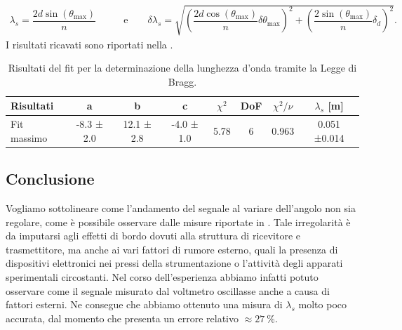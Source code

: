\documentclass[a4paper]{article}
\begin{document}
\begin{align}
  \lambda_s = \dfrac{2d \sin(\theta_{\text{max}})}{n} \qquad & \text{e}\qquad
  \delta \lambda_s = \sqrt{\left( \dfrac{2d \cos(\theta_{\text{max}})}{n}\delta \theta_{\text{max}}\right)^2 + \left(\dfrac{2\sin(\theta_{\text{max}})}{n}\delta_d\right)^2}. \label{eq:lunghezza_bragg}
\end{align}
I risultati ricavati sono riportati nella .
\begin{table}[htbp]
\centering
\begin{tabular}{|l|ccccccc|}
\hline
Risultati & a & b & c & $\chi^2$ & DoF & $\chi^2/\nu$ & $\lambda_s$ [\si{\meter}]  \\\hline\hline
Fit massimo & -8.3 ± 2.0 & 12.1 ± 2.8 & -4.0 ± 1.0 & 5.78 & 6 & 0.963 & 0.051 ±0.014\\\hline
\end{tabular}
\caption{Risultati del fit per la determinazione della lunghezza d'onda tramite la Legge di Bragg.}
\label{tab:fit_bragg}
\end{table}

\subsection{Conclusione}
Vogliamo sottolineare come l'andamento del segnale al variare dell'angolo non sia regolare, come è possibile osservare dalle misure riportate in . Tale irregolarità è da imputarsi agli effetti di bordo dovuti alla struttura di ricevitore e trasmettitore, ma anche ai vari fattori di rumore esterno, quali la presenza di dispositivi elettronici nei pressi della strumentazione o l'attività degli apparati sperimentali circostanti. Nel corso dell'esperienza abbiamo infatti potuto osservare come il segnale misurato dal voltmetro oscillasse anche a causa di fattori esterni. Ne consegue che abbiamo ottenuto una misura di $\lambda_s$ molto poco accurata, dal momento che presenta un errore relativo $\approx \SI{27}{\percent}$.
\end{document}
